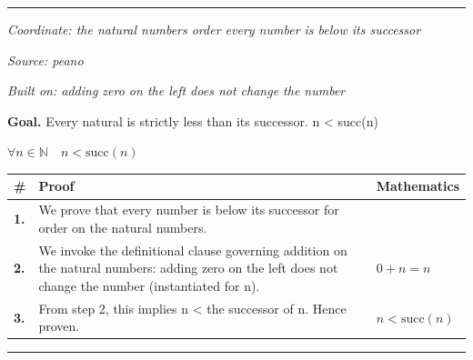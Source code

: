 \documentclass[11pt]{article}
\theoremstyle{definition}
\begin{document}
\label{thm:Nat-order-less_or_equal_is_transitive}
\par\medskip\hrule
\bigskip
{}\par
\smallskip\noindent\textit{Coordinate: the natural numbers \cdot order \cdot every number is below its successor}\par
\smallskip\noindent\textit{Source: peano}\par
\smallskip\noindent\textit{Built on: adding zero on the left does not change the number}\par
\medskip
\noindent\textbf{Goal.} Every natural is strictly less than its successor.  n < succ(n)\par
\noindent$\displaystyle \forall n \in \mathbb{N}\quad n < \mathrm{succ}(n)$\par
\medskip
\noindent
\begin{tabular}{@{} >{\raggedright\arraybackslash}p{} >{\raggedright\arraybackslash}p{} >{\raggedleft\arraybackslash}p{} @{}}
\textbf{\#} & \textbf{Proof} & \textbf{Mathematics} \\
\midrule
\textbf{1.} & We prove that every number is below its successor for order on the natural numbers. & \\[0.45em]
\textbf{2.} & We invoke the definitional clause governing addition on the natural numbers: adding zero on the left does not change the number (instantiated for n). & $\displaystyle 0 + n = n$ \\[0.45em]
\textbf{3.} & From step 2, this implies n < the successor of n. Hence proven. & $\displaystyle n < \mathrm{succ}(n)$ \\[0.45em]
\bottomrule
\end{tabular}
\label{thm:Nat-order-every_number_is_below_its_successor}
\par\medskip\hrule
\end{document}
